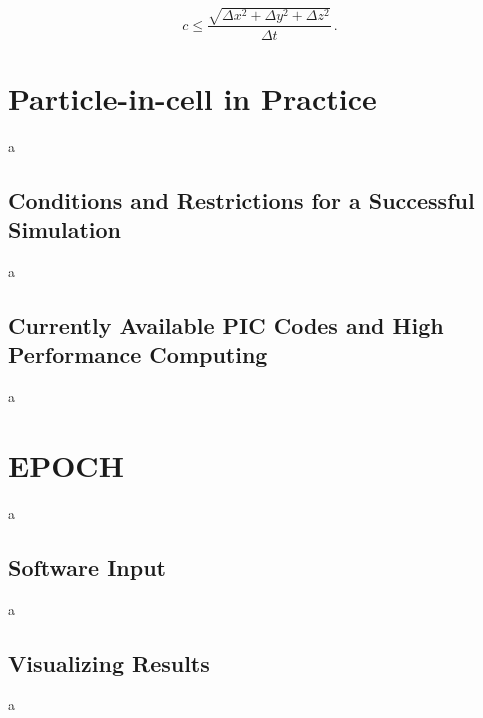 \documentclass[12pt, class=report, crop=false]{standalone}
\begin{document}
\begin{equation}
  c \leq \frac{\sqrt{\Delta x^2 + \Delta y^2 + \Delta z^2}}{\Delta t}\,.
\end{equation}

\section{Particle-in-cell in Practice}
a
\subsection{Conditions and Restrictions for a Successful Simulation}
a
\subsection{Currently Available PIC Codes and High Performance Computing}
a

\section{EPOCH}
a
\subsection{Software Input}
a
\subsection{Visualizing Results}
a
\end{document}
